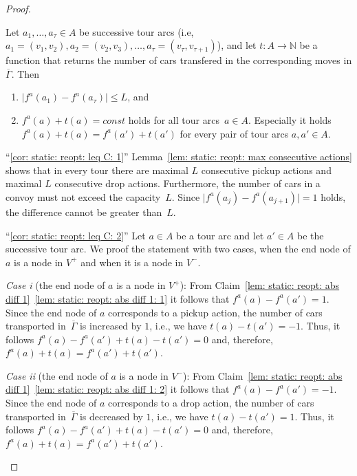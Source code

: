 \documentclass[english]{llncs}
\numberwithin{sublemma}{lemma}
\newcommand{\abs}[1]{\ensuremath{\lvert #1 \rvert}}
\newcommand{\NN}{\ensuremath{\mathbb{N}}}
\newcommand{\capd}{\ensuremath{L}}
\newcommand{\tourd}{\ensuremath{\Gamma}}
\newcommand{\Vpick}{{V^+}}
\newcommand{\Vdrop}{{V^-}}
\begin{document}
\begin{proof}
\begin{sublemma}
\label{cor: static: reopt: leq C}
Let $a_1, \dotsc, a_\tau \in A$ be successive tour arcs (i.e, $a_1 = (v_1, v_2), a_2 = (v_2, v_3), \dotsc, a_\tau = (v_\tau, v_{\tau+1})$), and
let $t : A \to \NN$ be a function that returns the number of cars transfered in the corresponding moves in $\overline{\tourd}$.
Then
\begin{enumerate}
 \item \label{cor: static: reopt: leq C: 1} $\abs{f^a(a_1) - f^a(a_\tau)} \leq \capd$, and
 \item \label{cor: static: reopt: leq C: 2} $f^a(a) + t(a) = {const}$ holds for all tour arcs~$a \in A$.
  Especially it holds $f^a(a) + t(a) = f^a(a') + t(a')$ for every pair of tour arcs $a, a' \in A$.
\end{enumerate}
\end{sublemma}



\begin{subproof}
``\ref{cor: static: reopt: leq C: 1}''
Lemma~\ref{lem: static: reopt: max consecutive actions} shows that in every tour there are maximal $\capd$ consecutive pickup actions and maximal $\capd$ consecutive drop actions.
Furthermore, the number of cars in a convoy must not exceed the capacity~$\capd$.
Since $\abs{f^a(a_j) - f^a(a_{j + 1})} = 1$ holds, the difference cannot be greater than~$\capd$.


``\ref{cor: static: reopt: leq C: 2}''
Let $a \in A$ be a tour arc and let $a' \in A$ be the successive tour arc.
We proof the statement with two cases, when the end node of $a$ is a node in $\Vpick$ and when it is a node in $\Vdrop$.

\textit{Case i} (the end node of $a$ is a node in $\Vpick$):
From Claim~\ref{lem: static: reopt: abs diff 1}~\ref{lem: static: reopt: abs diff 1: 1} it follows that $f^a(a) - f^a(a') = 1$.
Since the end node of $a$ corresponds to a pickup action, the number of cars transported in~$\overline{\tourd}$ is increased by $1$, i.e., we have $t(a) - t(a') = -1$.
Thus, it follows $f^a(a) - f^a(a') + t(a) - t(a') = 0$ and, therefore, $f^a(a) + t(a) = f^a(a') + t(a')$.

\textit{Case ii} (the end node of $a$ is a node in $\Vdrop$):
From Claim~\ref{lem: static: reopt: abs diff 1}~\ref{lem: static: reopt: abs diff 1: 2} it follows that $f^a(a) - f^a(a') = -1$.
Since the end node of $a$ corresponds to a drop action, the number of cars transported in~$\overline{\tourd}$ is decreased by $1$, i.e., we have $t(a) - t(a') = 1$.
Thus, it follows $f^a(a) - f^a(a') + t(a) - t(a') = 0$ and, therefore, $f^a(a) + t(a) = f^a(a') + t(a')$.


\end{subproof}
\end{proof}
\end{document}
